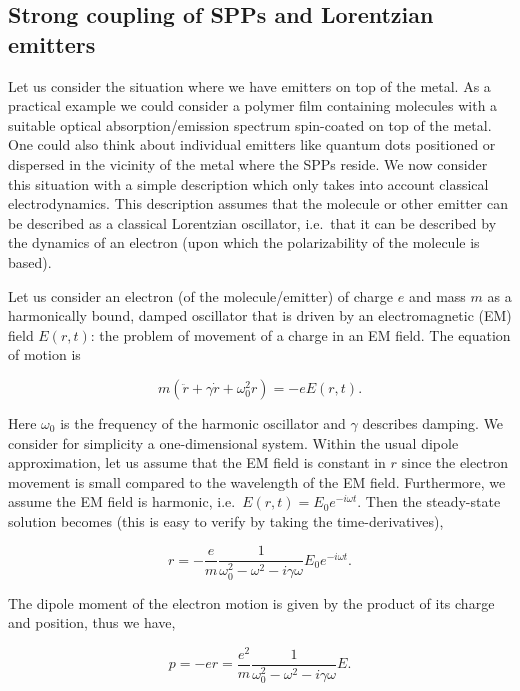 \documentclass[12pt]{iopart}
\begin{document}
\subsection{Strong coupling of SPPs and Lorentzian emitters}  \label{SPP+Lorentzian}

Let us consider the situation where we have emitters on top of the metal. As a practical example we could consider a polymer film containing molecules with a suitable optical absorption/emission spectrum spin-coated on top of the metal. One could also think about individual emitters like quantum dots positioned or dispersed in the vicinity of the metal where the SPPs reside. We now consider this situation with a simple description which only takes into account classical electrodynamics. This description assumes that the molecule or other emitter can be described as a classical Lorentzian oscillator, i.e.\ that it can be described by the dynamics of an electron (upon which the polarizability of the molecule is based).

Let us consider an electron (of the molecule/emitter) of charge $e$ and mass $m$ as a harmonically bound, damped oscillator that is driven by an electromagnetic (EM) field $E(r,t)$: the problem of movement of a charge in an EM field. The equation of motion is

\begin{equation}
m (\ddot{r} + \gamma \dot{r} + \omega_0^2 r) = - e E(r,t)  .
\end{equation}

\noindent Here $\omega_0$ is the frequency of the harmonic oscillator and $\gamma$ describes damping. We consider for simplicity a one-dimensional system. Within the usual dipole approximation, let us assume that the EM field is constant in $r$ since the electron movement is small compared to the wavelength of the EM field. Furthermore, we assume the EM field is harmonic, i.e.\ $E(r,t) = E_0 e^{-i \omega t}$. Then the steady-state solution becomes (this is easy to verify by taking the time-derivatives),

\begin{equation}
r = -\frac{e}{m} \frac{1}{ \omega_0^2 - \omega^2 - i\gamma \omega} E_0 e^{-i \omega t} .
\end{equation}

\noindent The dipole moment of the electron motion is given by the product of its charge and position, thus we have,

\begin{equation}
p = - e r = \frac{e^2}{m} \frac{1}{ \omega_0^2 - \omega^2 - i\gamma \omega} E.
\end{equation} 
\end{document}
